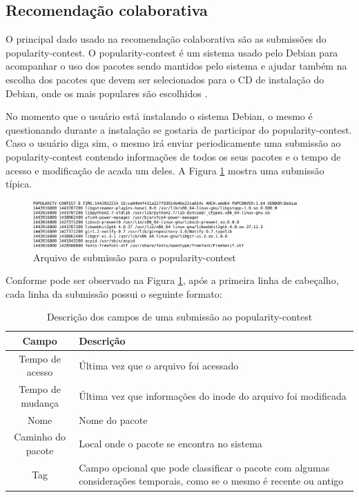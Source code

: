 \subsection{Recomendação colaborativa}

O principal dado usado na recomendação colaborativa são as submissões do
popularity-contest. O popularity-contest é um sistema usado pelo Debian para
acompanhar o uso dos pacotes sendo mantidos pelo sistema e ajudar também na
escolha dos pacotes que devem ser selecionados para o CD de instalação do
Debian, onde os mais populares são escolhidos \cite{araujo2011apprecommender}.

No momento que o usuário está instalando o sistema Debian, o mesmo é
questionando durante a instalação se gostaria de participar do
popularity-contest. Caso o usuário diga sim, o mesmo irá enviar periodicamente
uma submissão ao popularity-contest contendo informações de todos os seus
pacotes e o tempo de acesso e modificação de acada um deles. A Figura
\ref{fig:submissao_popcon} mostra uma submissão típica.

\begin{figure}[h]
  \centering
  \includegraphics[width=0.9\textwidth]{figuras/submissao_popcon.eps}
  \caption{Arquivo de submissão para o popularity-contest}
  \label{fig:submissao_popcon}
\end{figure}

Conforme pode ser observado na Figura \ref{fig:submissao_popcon}, após a
primeira linha de cabeçalho, cada linha da submissão possui o seguinte formato:

\begin{table}[h!]
\centering
\newcommand\T{\rule{0pt}{2.8ex}}
\newcommand\B{\rule[-1.8ex]{0pt}{0pt}}
\begin{tabularx}{15cm}{| c | X |}
\hline
\rowcolor[HTML]{EFEFEF}
{\textbf{Campo}} & \textbf{Descrição} \\ \hline
{Tempo de acesso}  & Última vez que o arquivo foi acessado \\ \hline
{Tempo de mudança}   & Última vez que informações do inode do arquivo foi
                       modificada\\ \hline
{Nome}   & Nome do pacote                  \\ \hline
{Caminho do pacote}   & Local onde o pacote se encontra no sistema \\ \hline
{Tag}   & Campo opcional que pode classificar o pacote com algumas considerações
temporais, como se o mesmo é recente ou antigo\\ \hline
\end{tabularx}
\caption{Descrição dos campos de uma submissão ao popularity-contest}
\label{tab:submissao_popcon}
\end{table}

